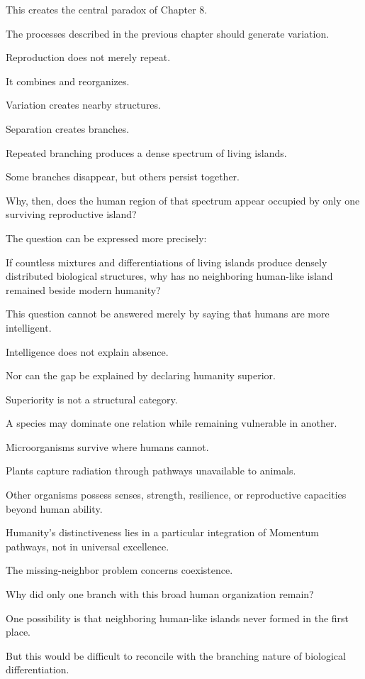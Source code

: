 This creates the central paradox of Chapter 8.

The processes described in the previous chapter should generate variation.

Reproduction does not merely repeat.

It combines and reorganizes.

Variation creates nearby structures.

Separation creates branches.

Repeated branching produces a dense spectrum of living islands.

Some branches disappear, but others persist together.

Why, then, does the human region of that spectrum appear occupied by only one surviving reproductive island?

The question can be expressed more precisely:

If countless mixtures and differentiations of living islands produce densely distributed biological structures, why has no neighboring human-like island remained beside modern humanity?

This question cannot be answered merely by saying that humans are more intelligent.

Intelligence does not explain absence.

Nor can the gap be explained by declaring humanity superior.

Superiority is not a structural category.

A species may dominate one relation while remaining vulnerable in another.

Microorganisms survive where humans cannot.

Plants capture radiation through pathways unavailable to animals.

Other organisms possess senses, strength, resilience, or reproductive capacities beyond human ability.

Humanity’s distinctiveness lies in a particular integration of Momentum pathways, not in universal excellence.

The missing-neighbor problem concerns coexistence.

Why did only one branch with this broad human organization remain?

One possibility is that neighboring human-like islands never formed in the first place.

But this would be difficult to reconcile with the branching nature of biological differentiation.


